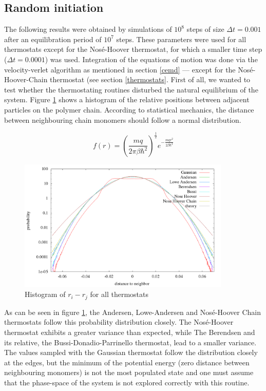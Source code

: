 % 
\graphicspath{{../graphics/}}


\subsection{Random initiation}
The following results were obtained by simulations of $10^8$ steps of size $\Delta t = 0.001$ after an equilibration period of $10^7$ steps. These parameters were used for all thermostats except for the Nosé-Hoover thermostat, for which a smaller time step ($\Delta t = 0.0001$) was used. Integration of the equations of motion was done via the velocity-verlet algorithm as mentioned in section \ref{cemd} --- except for the Nosé-Hoover-Chain thermostat (see section \ref{thermostats}.   
First of all, we wanted to test whether the thermostating routines disturbed the natural equilibrium of the system. Figure \ref{im:relPos_rand} shows a histogram of the relative positions between adjacent particles on the polymer chain. According to statistical mechanics, the distance between neighbouring chain monomers should follow a normal distribution.

\begin{equation}
f(r) = \left(\frac{mq}{2\pi\beta\hbar^2}\right)^{\frac{1}{2}}e^{-\frac{mqr^2}{2\beta\hbar^2}}
\end{equation}  

\begin{figure}[H]
\centering
\includegraphics[width=0.9\textwidth]{./graphics/Histogramm_relPos_rand_T=20_p=64.png}
\caption{Histogram of $r_i - r_j$ for all thermostats}
\label{im:relPos_rand}
\end{figure} 

As can be seen in figure \ref{im:relPos_rand}, the Andersen, Lowe-Andersen and Nosé-Hoover Chain thermostats follow this probability distribution closely. The Nosé-Hoover thermostat exhibits a greater variance than expected, while The Berendsen and its relative, the Bussi-Donadio-Parrinello thermostat,  lead to a smaller variance. The values sampled with the Gaussian thermostat follow the distribution closely at the edges, but the minimum of the potential energy (zero distance between neighbouring monomers) is not the most populated state and one must assume that the phase-space of the system is not explored correctly with this routine. 

